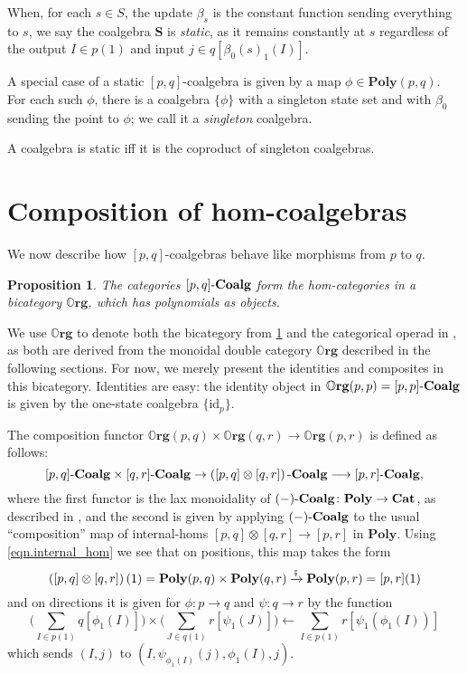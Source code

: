 \documentclass[11pt, one side, article]{memoir}
\theoremstyle{definition}
\theoremstyle{plain}
\newtheorem{proposition}[definitionx]{Proposition}
\newenvironment{example}
  {\pushQED{\qed}\renewcommand{\qedsymbol}{$\lozenge$}\examplex}
  {\popQED\endexamplex}
\newcommand{\Cat}[1]{\mathbf{#1}}%
\newcommand{\id}{\mathrm{id}}
\newcommand{\then}{\mathbin{\fatsemi}}
\newcommand{\too}{\longrightarrow}
\newcommand{\To}[2][]{\xrightarrow[#1]{#2}}
\newcommand{\from}{\leftarrow}
\newcommand{\tn}[1]{\textnormal{#1}}
\newcommand{\smcat}{\Cat{Cat}}
\newcommand{\poly}{\Cat{Poly}}
\newcommand{\0}{\textsf{0}}
\newcommand{\1}{\tn{\textsf{1}}}
\newcommand{\coalg}{\tn{-}\Cat{Coalg}}
\newcommand{\org}{{\mathbb{O}\Cat{rg}}}
\renewcommand{\S}{{\Cat{S}}}
\newcommand{\idcoalg}[1]{{\{\id_{#1}\}}}
\newcommand{\dnote}[1]{{\color{blue}David says:}~#1\quad{\color{blue}$\lozenge$}}
\begin{document}
When, for each $s \in S$, the update $\beta_s$ is the constant function sending everything to $s$, we say the coalgebra $\S$ is \emph{static}, as it remains constantly at $s$ regardless of the output $I \in p(1)$ and input $j\in q[\beta_0(s)_1(I)]$.

\begin{example}\label{ex.single_state}
A special case of a static $[p,q]$-coalgebra is given by a map $\phi \in \poly(p,q)$. For each such $\phi$, there is a coalgebra $\{\phi\}$ with a singleton state set and with $\beta_0$ sending the point to $\phi$; we call it a \emph{singleton} coalgebra. 

A coalgebra is static iff it is the coproduct of singleton coalgebras.
\end{example}



\section{Composition of hom-coalgebras}\label{sec.compose_hom_coalg}



We now describe how $[p,q]$-coalgebras behave like morphisms from $p$ to $q$.

\begin{proposition}\label{prop.def_org}
The categories $[p,q]\coalg$ form the hom-categories in a bicategory $\org$, which has polynomials as objects.
\end{proposition}

We use $\org$ to denote both the bicategory from \cref{prop.def_org} and the categorical operad in \cite[Definition 2.19]{spivak2021learners}, as both are derived from the monoidal double category $\org$ described in the following sections. For now, we merely present the identities and composites in this bicategory. Identities are easy: the identity object in $\org(p,p)=[p,p]\coalg$ is given by the one-state coalgebra $\idcoalg{p}$. 

The composition functor $\org(p,q)\times\org(q,r)\too\org(p,r)$ is defined as follows:
\[[p,q]\coalg \times [q,r]\coalg \to \left([p,q] \otimes [q,r]\right)\coalg \too [p,r]\coalg,\]
where the first functor is the lax monoidality of $(-)\coalg\colon\poly \to \smcat$, as described in \cite[Proposition 2.13]{spivak2021learners}, and the second is given by applying $(-)\coalg$ to the usual ``composition'' map of internal-homs $[p,q] \otimes [q,r] \to [p,r]$ in $\poly$. Using \eqref{eqn.internal_hom} we see that on positions, this map takes the form\vspace{-.1cm}
\[\left([p,q] \otimes [q,r]\right)(1) = \poly(p,q) \times \poly(q,r) \To{\then} \poly(p,r) = [p,r](1)\]
and on directions it is given for $\phi\colon p \to q$ and $\psi\colon q \to r$ by the function
\[\bigg(\sum_{I \in p(1)} q[\phi_1(I)]\bigg) \times \bigg(\sum_{J \in q(1)} r[\psi_1(J)]\bigg) \from \sum_{I \in p(1)} r[\psi_1(\phi_1(I))]\]
which sends $(I,j)$ to $(I,\psi_{\phi_1(I)}(j),\phi_1(I),j)$. 
\end{document}
